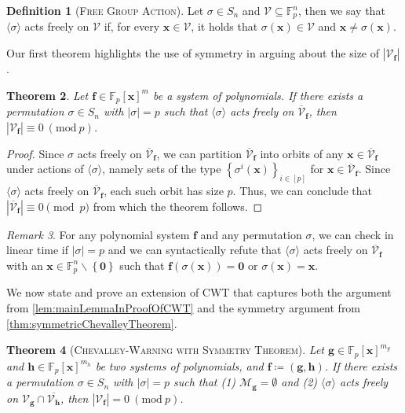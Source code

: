 \documentclass[10pt,a4paper]{article}
\newtheorem{theorem}{Theorem}
\theoremstyle{definition}
\newtheorem{definition}[theorem]{Definition}
\theoremstyle{remark}
\newtheorem{remark}[theorem]{Remark}
\newcommand{\inparen}[1]{\left ( #1 \right )}
\renewcommand{\mod}[1]{~\inparen{\mathrm{mod}~#1}}
\def\abs#1{\left|#1\right|}
\def\a#1{\langle#1\rangle}
\def\set#1{\left\{#1\right\}}
\newcommand{\F}{\ensuremath{\mathbb{F}}}
\newcommand{\bbF}{\ensuremath{\mathbb{F}}}
\newcommand{\calM}{\mathcal{M}}
\newcommand{\calV}{\mathcal{V}}
\renewcommand{\vec}[1]{\boldsymbol{#1}}
\newcommand{\vecf}{\ensuremath{\boldsymbol{f}}}
\newcommand{\vecg}{\ensuremath{\boldsymbol{g}}}
\newcommand{\vech}{\ensuremath{\boldsymbol{h}}}
\newcommand{\vecx}{\ensuremath{\boldsymbol{x}}}
\newcommand{\CWT}{CWT\xspace}
\begin{document}
\begin{definition}[\textsc{Free Group Action}]
    Let $\sigma \in S_n$ and $\calV \subseteq \bbF_p^n$, then we say that
  $\langle \sigma \rangle$ acts freely on $\calV$ if, for every
  $\vecx \in \calV$, it holds that $\sigma(\vecx) \in \calV$ and
  $\vecx \neq \sigma(\vecx)$.
\end{definition}

  Our first theorem highlights the
use of symmetry in arguing about the size of $\abs{\calV_{\vecf}}$.

\begin{theorem} \label{thm:symmetricChevalleyTheorem}
    Let $\vecf \in \F_p[\vecx]^m$ be a system of polynomials.
  If there exists a permutation $\sigma \in S_n$ with
  $\abs{\sigma} = p$ such that $\a{\sigma}$ acts freely on
  $\overline{\calV}_{\vecf}$, then $\abs{\calV_{\vecf}} \equiv 0 \mod{p}$.
\end{theorem}

\begin{proof}
    Since $\sigma$ acts freely on $\overline{\calV}_{\vecf}$, we can partition
  $\overline{\calV}_{\vecf}$ into orbits of any
  $\vecx \in \overline{\calV}_{\vecf}$ under actions of $\a{\sigma}$, namely
  sets of the type $\set{\sigma^i(\vecx)}_{i \in [p]}$ for
  $\vecx \in \overline{\calV}_{\vecf}$. Since $\a{\sigma}$ acts freely on
  $\overline{\calV}_{\vecf}$, each such orbit has size $p$. Thus, we can
  conclude that $\abs{\overline{\calV}_{\vecf}} \equiv 0 \pmod p$ from which
  the theorem follows.
\end{proof}

\begin{remark} \label{rem:syntacticVerificationOfSymmetry}
  For any polynomial system $\vecf$ and any
  permutation $\sigma$, we can check in linear time if $\abs{\sigma} = p$ and we
  can syntactically refute that $\langle \sigma \rangle$ acts freely on
  $\overline{\calV}_{\vecf}$ with an $\vecx \in \bbF_p^n \smallsetminus \set{\vec{0}}$ such that $\vecf(\sigma(\vecx)) = \vec{0}$ or $\sigma(\vecx) = \vecx$.
\end{remark}
\bigskip

We now state and prove an extension of \CWT that captures both
the argument from \autoref{lem:mainLemmaInProofOfCWT} and the symmetry
argument from \autoref{thm:symmetricChevalleyTheorem}.

\begin{theorem}[\textsc{Chevalley-Warning with Symmetry Theorem}]
\label{thm:combinedChevalleyTheorem}
	  Let $\vecg \in \F_p[\vecx]^{m_g}$ and
	$\vech \in \F_p[\vecx]^{m_h}$ be two systems of polynomials, and
	$\vecf \coloneqq (\vecg, \vech)$. If there exists a permutation $\sigma \in S_n$ with $\abs{\sigma} = p$ such that (1) $\calM_{\vecg} = \emptyset$ and (2) $\a{\sigma}$ acts freely on
	$\calV_{\vecg} \cap \overline{\calV_{\vech}}$, then $\abs{\calV_{\vecf}} = 0 \mod{p}$.
\end{theorem}
\end{document}
